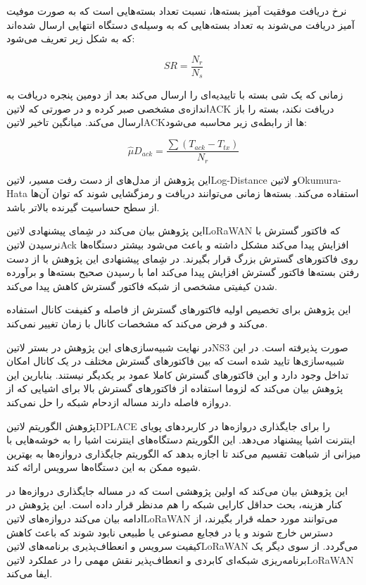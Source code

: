 نرخ دریافت موفقیت آمیز بسته‌ها، نسبت تعداد بسته‌هایی است که به صورت موفیت آمیز دریافت می‌شوند به
تعداد بسته‌هایی که به وسیله‌ی دستگاه انتهایی ارسال شده‌اند که به شکل زیر تعریف می‌شود:

\[
  SR = \frac{N_{r}}{N_{s}}
\]

زمانی که یک شی بسته با تاییدیه‌ای را ارسال می‌کند بعد از دومین پنجره دریافت به اندازه‌ی مشخصی صبر کرده و در صورتی
که ‌لاتین{‌ACK} دریافت نکند، بسته را باز ارسال می‌کند.
میانگین تاخیر ‌لاتین{ACK}ها از رابطه‌ی زیر محاسبه می‌شود:

\[
  \hat{\mu}D_{ack} = \frac{\sum(T_{ack} - T_{tx})}{N_{r}}
\]

این پژوهش از مدل‌های از دست رفت مسیر، ‌لاتین{Log-Distance} و ‌لاتین{Okumura-Hata} استفاده می‌کند.
بسته‌ها زمانی می‌توانند دریافت و رمزگشایی شوند که توان آن‌ها از سطح حساسیت گیرنده بالاتر باشد.

این پژوهش بیان می‌کند در شِمای پیشنهادی ‌لاتین{LoRaWAN} که فاکتور گسترش با نرسیدن ‌لاتین{Ack}
افزایش پیدا می‌کند مشکل داشته و باعث می‌شود بیشتر دستگاه‌ها روی فاکتورهای گسترش بزرگ قرار بگیرند.
در شِمای پیشنهادی این پژوهش با از دست رفتن بسته‌ها فاکتور گسترش افزایش پیدا می‌کند اما با رسیدن صحیح
بسته‌ها و برآورده شدن کیفیتی مشخصی از شبکه فاکتور گسترش کاهش پیدا می‌کند.

این پژوهش برای تخصیص اولیه فاکتورهای گسترش از فاصله و کفیفت کانال استفاده می‌کند و فرض می‌کند
که مشخصات کانال با زمان تغییر نمی‌کند.

در نهایت شبیه‌سازی‌های این پژوهش در بستر ‌لاتین{NS3} صورت پذیرفته است.
در این شبیه‌سازی‌ها تایید شده است که بین فاکتورهای گسترش مختلف در یک کانال امکان تداخل وجود دارد
و این فاکتورهای گسترش کاملا عمود بر یکدیگر نیستند.
بنابارین این پژوهش بیان می‌کند که لزوما استفاده از فاکتورهای گسترش بالا برای اشیایی که از دروازه
فاصله دارند مساله ازدحام شبکه را حل نمی‌کند.


پژوهش  الگوریتم ‌لاتین{DPLACE} را برای جایگذاری دروازه‌ها در کاربردهای پویای اینترنت اشیا پیشنهاد می‌دهد.
این الگوریتم دستگاه‌های اینترنت اشیا را به خوشه‌هایی با میزانی از شباهت تقسیم می‌کند تا اجازه بدهد که الگوریتم جایگذاری دروازه‌ها
به بهترین شیوه ممکن به این دستگاه‌ها سرویس ارائه کند.

این پژوهش بیان می‌کند که اولین پژوهشی است که در مساله جایگذاری دروازه‌ها در کنار هزینه، بحث حداقل کارایی شبکه را هم مدنظر
قرار داده است. این پژوهش در ادامه بیان می‌کند دروازه‌های ‌لاتین{LoRaWAN} می‌توانند مورد حمله قرار بگیرند، از دسترس خارج شوند
و یا در فجایع مصنوعی یا طبیعی نابود شوند که باعث کاهش کیفیت سرویس و انعطاف‌پذیری برنامه‌های ‌لاتین{LoRaWAN} می‌گردد.
از سوی دیگر یک برنامه‌ریزی شبکه‌ای کابردی و انعطاف‌پذیر نقش مهمی را در عملکرد ‌لاتین{LoRaWAN} ایفا می‌کند.

